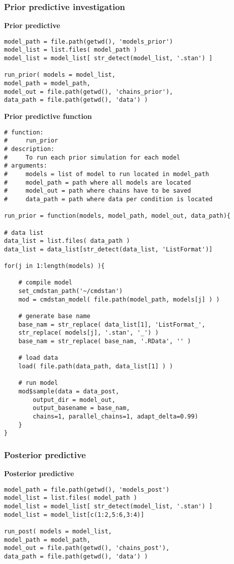 \subsubsection{Prior predictive investigation}

\noindent \textbf{Prior predictive}
%
\begin{lstlisting}
model_path = file.path(getwd(), 'models_prior')
model_list = list.files( model_path )
model_list = model_list[ str_detect(model_list, '.stan') ]

run_prior( models = model_list,
model_path = model_path,
model_out = file.path(getwd(), 'chains_prior'),
data_path = file.path(getwd(), 'data') )
\end{lstlisting}


\noindent \textbf{Prior predictive function}
%
\begin{lstlisting}
# function:
#     run_prior
# description:  
#     To run each prior simulation for each model
# arguments:
#     models = list of model to run located in model_path
#     model_path = path where all models are located
#     model_out = path where chains have to be saved
#     data_path = path where data per condition is located

run_prior = function(models, model_path, model_out, data_path){
	
# data list
data_list = list.files( data_path )
data_list = data_list[str_detect(data_list, 'ListFormat')]
	
for(j in 1:length(models) ){
		
	# compile model
	set_cmdstan_path('~/cmdstan')
	mod = cmdstan_model( file.path(model_path, models[j] ) )
	
	# generate base name
	base_nam = str_replace( data_list[1], 'ListFormat_', 
	str_replace( models[j], '.stan', '_') )
	base_nam = str_replace( base_nam, '.RData', '' )
		
	# load data
	load( file.path(data_path, data_list[1] ) )
		
	# run model
	mod$sample(data = data_post, 
		output_dir = model_out, 
		output_basename = base_nam,
		chains=1, parallel_chains=1, adapt_delta=0.99)
	}
}
\end{lstlisting}


\subsubsection{Posterior predictive}

\noindent \textbf{Posterior predictive}
%
\begin{lstlisting}
model_path = file.path(getwd(), 'models_post')
model_list = list.files( model_path )
model_list = model_list[ str_detect(model_list, '.stan') ]
model_list = model_list[c(1:2,5:6,3:4)]

run_post( models = model_list,
model_path = model_path,
model_out = file.path(getwd(), 'chains_post'),
data_path = file.path(getwd(), 'data') )
\end{lstlisting}


